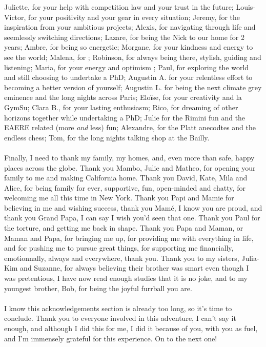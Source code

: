 Juliette, for your help with competition law and your trust in the future; Louis-Victor, for your positivity and your gear in every situation; Jeremy, for the inspiration from your ambitious projects; Alexis, for navigating through life and seemlessly switching directions; Lazare, for being the Nick to our home for 2 years; Ambre, for being so energetic;  Morgane, for your kindness and energy to see the world; Malena, for ; Robinson, for always being there, stylish, guiding and listening; Maria, for your energy and optimism ; Paul, for exploring the world and still choosing to undertake a PhD;  Augustin A. for your relentless effort to becoming a better version of yourself; Augustin L. for being the next climate grey eminence and the long nights across Paris; Eloïse, for your creativity and la GymSu; Clara B., for your lasting enthusiasm; Rico, for dreaming of other horizons together while undertaking a PhD; Julie for the Rimini fun and the EAERE related (more \textit{and} less) fun; Alexandre, for the Platt anecodtes and the endless chess; Tom, for the long nights talking shop at the Bailly.
\\\\
Finally, I need to thank my family, my homes, and, even more than safe, happy places across the globe. Thank you Mambo, Julie and Matheo, for opening your family to me and making California home. Thank you David, Kate, Mila and Alice, for being family for ever, supportive, fun, open-minded and chatty, for welcoming me all this time in New York. Thank you Papi and Mamie for believing in me and wishing success, thank you Mamé, I know you are proud, and thank you Grand Papa, I can say I wish you'd seen that one. Thank you Paul for the torture, and getting me back in shape. Thank you Papa and Maman, or Maman and Papa, for bringing me up, for providing me with everything in life, and for pushing me to pursue great things, for supporting me financially, emotionnally, always and everywhere, thank you. Thank you to my sisters, Julia-Kim and Suzanne, for always believing their brother was smart even though I was pretentious, I have now read enough studies that it is no joke, and to my youngest brother, Bob, for being the joyful furrball you are. 
\\\\
I know this acknowledgements section is already too long, so it's time to conclude. Thank you to everyone involved in this adventure, I can't say it enough, and although I did this for me, I did it because of you, with you as fuel, and I'm immensely grateful for this experience. On to the next one!

